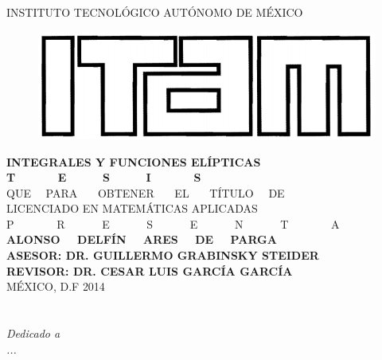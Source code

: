 \documentclass[spanish, openright,oneside]{book}
\theoremstyle{definition}
\begin{document}




\begin{titlepage}
\begin{center}
\Large {INSTITUTO TECNOLÓGICO AUTÓNOMO DE MÉXICO}
\begin{figure}[H]
 \vspace{1 cm}
  \centering
    \includegraphics[scale=0.5]{ITAM.png}
\end{figure}
 \vspace{1 cm}
 \textbf{INTEGRALES Y FUNCIONES ELÍPTICAS}
  \vspace{2.5cm}\\
  \Huge{\textbf{T \ \ \ \ \ \ E \ \ \ \ \ S \ \ \ \ \ I \ \ \ \ \ \ S}}
    \vspace{.4cm}\\
  \Large{QUE  \ \ PARA \ \ \ OBTENER \ \ \ EL \ \ \ TÍTULO \ \ DE 
   \vspace{.4cm}\\
  LICENCIADO EN MATEMÁTICAS APLICADAS 
   \vspace{.4cm}\\
  P \ \ \ \ \ \ \ R \ \ \ \ \ \ E \ \ \ \ \ \ S \ \ \ \ \ \ E \ \ \ \ \ \ N \ \ \ \ \ \ T \ \ \ \ \ \ \ A 
   \vspace{.4cm}\\
 \textbf{ALONSO \ \ DELFÍN \ \  ARES \ \ DE \ \ PARGA}}
    \vspace{1 cm}\\
\normalsize \textbf{ASESOR: DR. GUILLERMO GRABINSKY STEIDER}
    \vspace{.3 cm}\\
\textbf{REVISOR: DR. CESAR LUIS GARCÍA GARCÍA}
\vspace{1cm}\\
MÉXICO, D.F \hfill{2014}
\end{center}
\end{titlepage}

\newpage
\mbox{}
\thispagestyle{empty} %

\chapter*{}
\begin{flushright}
\textit{Dedicado a \\
...}
\end{flushright}
\end{document}
